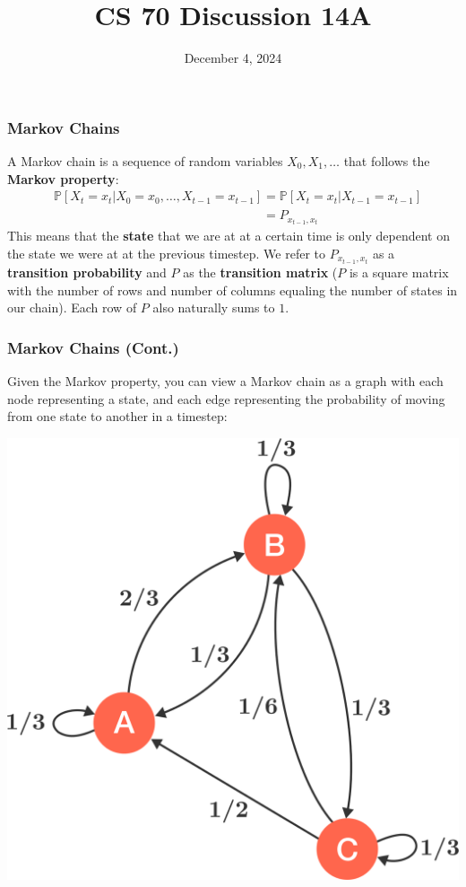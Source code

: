 \documentclass{beamer}
\title{CS 70 Discussion 14A}
\date{December 4, 2024}
\begin{document}
\frame{\titlepage}

\begin{frame}
    \frametitle{Markov Chains}
    A Markov chain is a sequence of random variables $X_0,X_1,\dots$ that follows the {\bf Markov property}:
    \begin{align*}
        &\mathbb{P}[X_t=x_t|X_0=x_0,\dots,X_{t-1}=x_{t-1}]=\mathbb{P}[X_t=x_t|X_{t-1}=x_{t-1}]\\
        &\phantom{\mathbb{P}[X_t=x_t|X_0=x_0,\dots,X_{t-1}=x_{t-1}]}=P_{x_{t-1},x_t}
    \end{align*}
    This means that the {\bf state} that we are at at a certain time is only dependent on the state we were at at the previous timestep. We refer to $P_{x_{t-1},x_t}$ as a {\bf transition probability} and $P$ as the {\bf transition matrix} ($P$ is a square matrix with the number of rows and number of columns equaling the number of states in our chain). Each row of $P$ also naturally sums to $1$.
\end{frame}

\begin{frame}
    \frametitle{Markov Chains (Cont.)}
    Given the Markov property, you can view a Markov chain as a graph with each node representing a state, and each edge representing the probability of moving from one state to another in a timestep:
    \begin{center}
        \includegraphics[scale=0.1]{Images/markov-chain.png}
    \end{center}
\end{frame}
\end{document}
